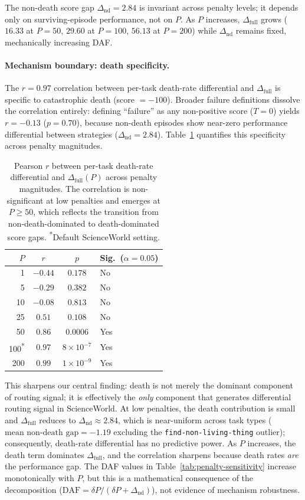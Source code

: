 \documentclass[11pt]{article}
\begin{document}
The non-death score gap $\Delta_{\text{nd}} = 2.84$ is invariant across penalty levels; it depends only on surviving-episode performance, not on $P$. As $P$ increases, $\Delta_{\text{full}}$ grows ($16.33$ at $P{=}50$, $29.60$ at $P{=}100$, $56.13$ at $P{=}200$) while $\Delta_{\text{nd}}$ remains fixed, mechanically increasing DAF.

\paragraph{Mechanism boundary: death specificity.}
The $r = 0.97$ correlation between per-task death-rate differential and $\Delta_{\text{full}}$ is specific to catastrophic death (score $= -100$). Broader failure definitions dissolve the correlation entirely: defining ``failure'' as any non-positive score ($T{=}0$) yields $r = -0.13$ ($p = 0.70$), because non-death episodes show near-zero performance differential between strategies ($\Delta_{\text{nd}} = 2.84$). Table~\ref{tab:penalty-correlation} quantifies this specificity across penalty magnitudes.

\begin{table}[h]
\centering
\small
\begin{tabular}{@{}rccl@{}}
\toprule
$P$ & $r$ & $p$ & Sig.\ ($\alpha{=}0.05$) \\
\midrule
1 & $-0.44$ & $0.178$ & No \\
5 & $-0.29$ & $0.382$ & No \\
10 & $-0.08$ & $0.813$ & No \\
25 & $0.51$ & $0.108$ & No \\
50 & $0.86$ & $0.0006$ & Yes \\
100\textsuperscript{*} & $0.97$ & $8 \times 10^{-7}$ & Yes \\
200 & $0.99$ & $1 \times 10^{-9}$ & Yes \\
\bottomrule
\end{tabular}
\caption{Pearson $r$ between per-task death-rate differential and $\Delta_{\text{full}}(P)$ across penalty magnitudes. The correlation is non-significant at low penalties and emerges at $P \geq 50$, which reflects the transition from non-death-dominated to death-dominated score gaps. \textsuperscript{*}Default ScienceWorld setting.}
\label{tab:penalty-correlation}
\end{table}

This sharpens our central finding: death is not merely the dominant component of routing signal; it is effectively the \emph{only} component that generates differential routing signal in ScienceWorld. At low penalties, the death contribution is small and $\Delta_{\text{full}}$ reduces to $\Delta_{\text{nd}} \approx 2.84$, which is near-uniform across task types ($\text{mean non-death gap} = -1.19$ excluding the \texttt{find-non-living-thing} outlier); consequently, death-rate differential has no predictive power. As $P$ increases, the death term dominates $\Delta_{\text{full}}$, and the correlation sharpens because death rates \emph{are} the performance gap. The DAF values in Table~\ref{tab:penalty-sensitivity} increase monotonically with $P$, but this is a mathematical consequence of the decomposition ($\text{DAF} = \delta P / (\delta P + \Delta_{\text{nd}})$), not evidence of mechanism robustness.
\end{document}

